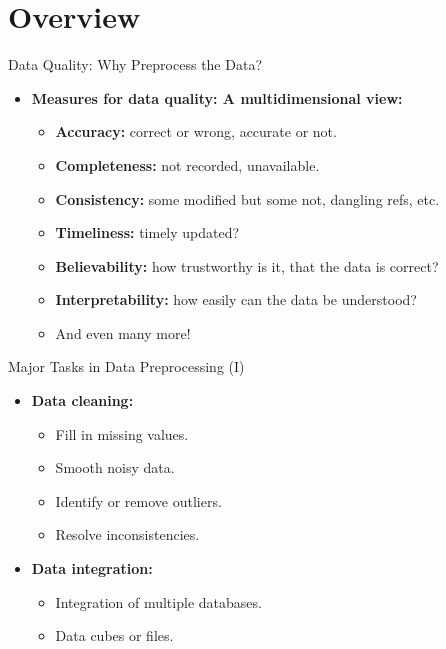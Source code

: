 \section{Overview}

\begin{frame}{Data Quality: Why Preprocess the Data?}
	\begin{itemize}
		\item \textbf{Measures for {\color{airforceblue}data quality}: A
			      multidimensional view:}
		      \begin{itemize}
			      \item \textbf{Accuracy:} correct or wrong, accurate or not.
			      \item \textbf{Completeness:} not recorded, unavailable.
			      \item \textbf{Consistency:} some modified but some not, dangling
			            refs, etc.
			      \item \textbf{Timeliness:} timely updated?
			      \item \textbf{Believability:} how trustworthy is it, that the data
			            is correct?
			      \item \textbf{Interpretability:} how easily can the data be
			            understood?
			      \item And even many more!
		      \end{itemize}
	\end{itemize}
\end{frame}

\begin{frame}{Major Tasks in Data Preprocessing (I)}
	\begin{itemize}
		\item \textbf{Data cleaning:}
		      \begin{itemize}
			      \item Fill in missing values.
			      \item Smooth noisy data.
			      \item Identify or remove outliers.
			      \item Resolve inconsistencies.
		      \end{itemize}
		\item \textbf{Data integration:}
		      \begin{itemize}
			      \item Integration of multiple databases.
			      \item Data cubes or files.
		      \end{itemize}
	\end{itemize}
\end{frame}

